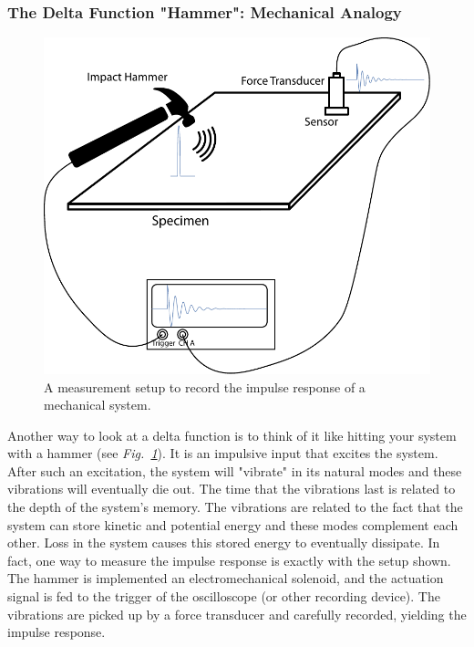 \subsubsection{The Delta Function "Hammer":  Mechanical Analogy}
\begin{figure}[tb]
\centering
\includegraphics[width=.5\columnwidth]{hammer_resonance}
\caption{A measurement setup to record the impulse response of a mechanical system. }
\label{fig:hammer_setup}
\end{figure}
Another way to look at a delta function is to think of it like hitting your system with a hammer (see \emph{Fig.~\ref{fig:hammer_setup}}).  It is an impulsive input that excites the system.  After such an excitation, the system will "vibrate" in its natural modes and these vibrations will eventually die out.  The time that the vibrations last is related to the depth of the system's memory.  The vibrations are related to the fact that the system can store kinetic and potential energy and these modes complement each other.  Loss in the system causes this stored energy to eventually dissipate.  In fact, one way to measure the impulse response is exactly with the setup shown.  The hammer is implemented an electromechanical solenoid, and the actuation signal is fed to the trigger of the oscilloscope (or other recording device).  The vibrations are picked up by a force transducer and carefully recorded, yielding the impulse response.     
